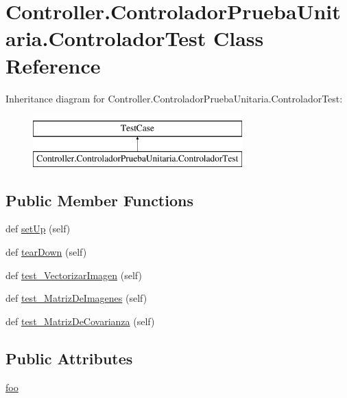 \hypertarget{class_controller_1_1_controlador_prueba_unitaria_1_1_controlador_test}{}\section{Controller.\+Controlador\+Prueba\+Unitaria.\+Controlador\+Test Class Reference}
\label{class_controller_1_1_controlador_prueba_unitaria_1_1_controlador_test}
Inheritance diagram for Controller.\+Controlador\+Prueba\+Unitaria.\+Controlador\+Test\+:\begin{figure}[H]
\begin{center}
\leavevmode
\includegraphics[height=2.000000cm]{class_controller_1_1_controlador_prueba_unitaria_1_1_controlador_test}
\end{center}
\end{figure}
\subsection*{Public Member Functions}
\begin{DoxyCompactItemize}
\item 
def \hyperlink{class_controller_1_1_controlador_prueba_unitaria_1_1_controlador_test_a2e8184870a51acab5ddda57d6ae0a6af}{set\+Up} (self)
\item 
def \hyperlink{class_controller_1_1_controlador_prueba_unitaria_1_1_controlador_test_a0aa297aa7af4503138e4e84d3fcd40d2}{tear\+Down} (self)
\item 
def \hyperlink{class_controller_1_1_controlador_prueba_unitaria_1_1_controlador_test_ab91d55bbbbfb2b11399063e00460fed6}{test\+\_\+\+Vectorizar\+Imagen} (self)
\item 
def \hyperlink{class_controller_1_1_controlador_prueba_unitaria_1_1_controlador_test_a149c2fe8732cf438622aefdfad75dd4a}{test\+\_\+\+Matriz\+De\+Imagenes} (self)
\item 
def \hyperlink{class_controller_1_1_controlador_prueba_unitaria_1_1_controlador_test_a7bdd98073dfdcbe13627c7bee7d64f55}{test\+\_\+\+Matriz\+De\+Covarianza} (self)
\end{DoxyCompactItemize}
\subsection*{Public Attributes}
\begin{DoxyCompactItemize}
\item 
\hyperlink{class_controller_1_1_controlador_prueba_unitaria_1_1_controlador_test_a2f176dc83cda878c82e90b5eed2c321a}{foo}
\end{DoxyCompactItemize}


